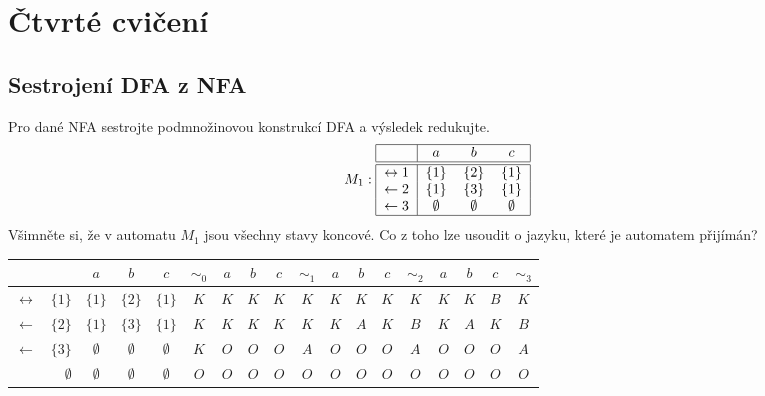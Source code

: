 \section{Čtvrté cvičení}

\subsection{Sestrojení DFA z NFA}
Pro dané NFA sestrojte podmnožinovou konstrukcí DFA a výsledek redukujte.
\[
M_1:
\begin{tabular}{|r|c c c|}
    \hline
    & $a$ & $b$ & $c$\\
    \hline
    \hline
    $\leftrightarrow 1$& $\{1\}$ & $\{2\}$& $\{1\}$\\
    $\leftarrow2$      & $\{1\}$ & $\{3\}$& $\{1\}$\\
    $\leftarrow3$      & $\emptyset$ & $\emptyset$& $\emptyset$\\
    \hline
\end{tabular}
\]
Všimněte si, že v automatu $M_1$ jsou všechny stavy koncové. Co z toho lze usoudit o jazyku, které je automatem přijímán?
\begin{center}
    \begin{tabular}{|r r|c c c||c|c c c||c|c c c||c|c c c||c|}
        \hline
        & $ $ & $ a $ & $ b $ & $ c $ & $ \sim_0 $ & $ a $ & $ b $ & $ c $ & $ \sim_1 $ & $ a $ & $ b $ & $ c $ & $ \sim_2 $ & $ a $ & $ b $ & $ c $ & $ \sim_3 $ \\ \hline \hline
        $\leftrightarrow$ & $\{1\}  $ & $ \{1\} $ & $ \{2\} $ & $ \{1\} $ & $ K $ & $ K $ & $ K $ & $ K $ & $ K $ & $ K $ & $ K $ & $ K $ & $ K $ & $ K $ & $ K $ & $ B $ & $ K $ \\
        $\leftarrow$     & $\{2\}  $ & $ \{1\} $ & $ \{3\}  $ & $ \{1\} $ & $ K $ & $ K $ & $ K $ & $ K $ & $ K $ & $ K $ &$ A $ & $ K $ & $ B $ & $ K $ & $ A $ & $ K $ & $ B $ \\
        $\leftarrow$     & $ \{3\} $ & $ \emptyset $ & $ \emptyset $ & $ \emptyset $ & $ K $ & $ O $ & $ O $ & $ O $ & $ A $ & $ O $ & $ O $ & $ O $ & $ A $ & $ O $ & $ O $ & $ O $ & $ A $ \\
                         & $ \emptyset $ & $ \emptyset $ & $ \emptyset $ & $ \emptyset $ & $ O $ & $ O $ & $ O $ & $ O $ & $ O $ & $ O $ & $ O $ & $ O $ & $ O $ & $ O $ & $ O $ & $ O $ & $ O $ \\
        \hline
\end{tabular}\\
\end{center}

